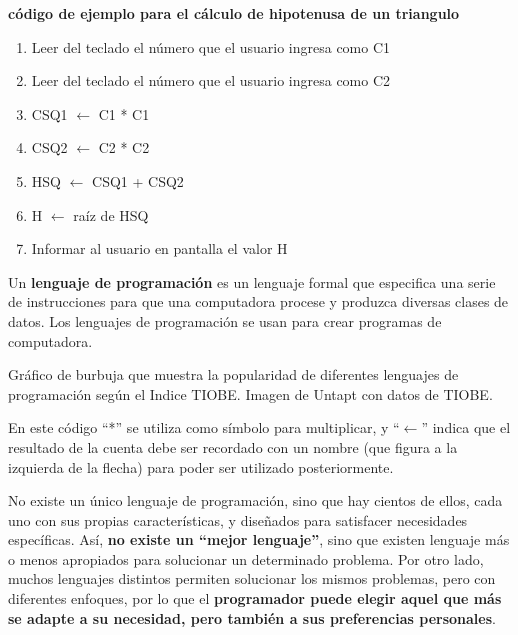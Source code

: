 \begin{example}
    \textbf{código de ejemplo para el cálculo de hipotenusa de un triangulo}

    \begin{enumerate}
        \item Leer del teclado el número que el usuario ingresa como C1
        \item Leer del teclado el número que el usuario ingresa como C2
        \item CSQ1 $\leftarrow$ C1 * C1
        \item CSQ2 $\leftarrow$ C2 * C2
        \item HSQ $\leftarrow$ CSQ1 + CSQ2
        \item H $\leftarrow$ raíz de HSQ
        \item Informar al usuario en pantalla el valor H
    \end{enumerate}
\end{example}

\begin{definition}
    Un \textbf{lenguaje de programación} es un lenguaje formal que especifica
    una serie de instrucciones para que una computadora procese y produzca
    diversas clases de datos. Los lenguajes de programación se usan para crear
    programas de computadora.\autocite{sebesta_2005}
\end{definition}

{Gráfico de burbuja que muestra la popularidad de diferentes lenguajes de
programación según el Indice TIOBE.} {Imagen de Untapt con datos de TIOBE.}

En este código ``*'' se utiliza como símbolo para multiplicar, y
``$\leftarrow$'' indica que el resultado de la cuenta debe ser recordado con un
nombre (que figura a la izquierda de la flecha) para poder ser utilizado
posteriormente.

No existe un único lenguaje de programación, sino que hay cientos de ellos, cada
uno con sus propias características, y diseñados para satisfacer necesidades
específicas. Así, \textbf{no existe un ``mejor lenguaje''}, sino que existen
lenguaje más o menos apropiados para solucionar un determinado problema. Por
otro lado, muchos lenguajes distintos permiten solucionar los mismos problemas,
pero con diferentes enfoques, por lo que el \textbf{programador puede elegir
aquel que más se adapte a su necesidad, pero también a sus preferencias
personales}.

